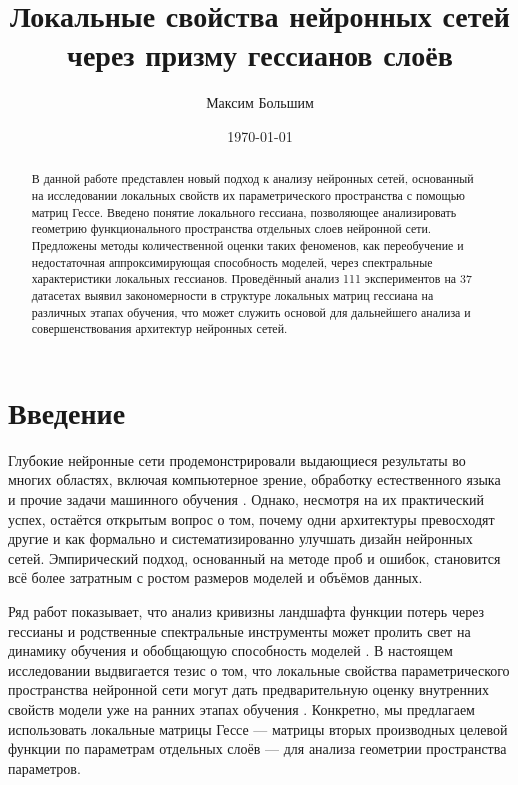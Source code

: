 \documentclass[a4paper,12pt]{article}
\title{Локальные свойства нейронных сетей через призму гессианов слоёв}
\author{Максим Большим}
\date{\today}
\begin{document}
\sloppy
\maketitle

\begin{abstract}
  В данной работе представлен новый подход к анализу нейронных сетей, основанный на исследовании локальных
  свойств их параметрического пространства с помощью матриц Гессе. Введено понятие локального гессиана,
  позволяющее анализировать геометрию функционального пространства отдельных слоев нейронной сети. Предложены
  методы количественной оценки таких феноменов, как переобучение и недостаточная аппроксимирующая способность
  моделей, через спектральные характеристики локальных гессианов. Проведённый анализ 111 экспериментов на 37
  датасетах выявил закономерности в структуре локальных матриц гессиана на различных этапах обучения,
  что может служить основой для дальнейшего анализа и совершенствования архитектур нейронных сетей.
\end{abstract}

\section{Введение}

Глубокие нейронные сети продемонстрировали выдающиеся результаты во многих областях, включая компьютерное
зрение, обработку естественного языка и прочие задачи машинного обучения \cite{lecun2015deep,
goodfellow2016deep}. Однако, несмотря на их практический успех, остаётся открытым вопрос о том, почему одни
архитектуры превосходят другие и как формально и систематизированно улучшать дизайн нейронных сетей.
Эмпирический подход, основанный на методе проб и ошибок, становится всё более затратным с ростом размеров
моделей и объёмов данных.

Ряд работ показывает, что анализ кривизны ландшафта функции потерь через гессианы и родственные спектральные
инструменты может пролить свет на динамику обучения и обобщающую способность моделей
\cite{sagun2017empirical, maheswaranathan2019universality, lee2019wide, arora2019finegrained}. В настоящем
исследовании выдвигается тезис о том, что локальные свойства параметрического пространства нейронной сети
могут дать предварительную оценку внутренних свойств модели уже на ранних этапах обучения
\cite{poole2016transient}. Конкретно, мы предлагаем использовать локальные матрицы Гессе — матрицы вторых
производных целевой функции по параметрам отдельных слоёв — для анализа геометрии пространства параметров.
\end{document}
